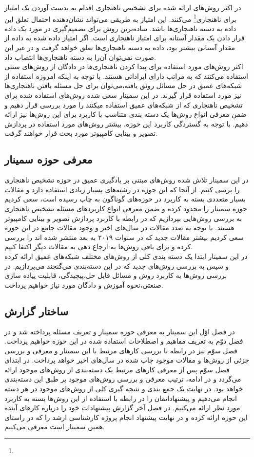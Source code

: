 \documentclass[12pt,a4paper]{article}
\theoremstyle{definition}
\theoremstyle{theorem}
\theoremstyle{definition}
\begin{document}
در اکثر روش‌های ارائه شده برای تشخیص ناهنجاری اقدام به بدست آوردن یک امتیاز برای ناهنجاری\footnote{} می‌کنند. این امتیاز به طریقی می‌تواند نشان‌‌دهنده احتمال تعلق این داده به دسته ناهنجاری‌ها باشد. ساده‌ترین روش برای تصمیم‌گیری در مورد یک داده قرار دادن یک مقدار آستانه برای امتیاز ناهنجاری است. اگر امتیاز داده شده به داده از مقدار آستانی بیشتر بود، داده به دسته ناهنجاری‌ها تعلق خواهد گرفت و در غیر این صورت نمی‌توان آن‌را به دسته ناهنجاری‌ها انتصاب داد.\\

اکثر روش‌های مورد استفاده برای پیدا کردن ناهنجاری‌ها در دادگان از روش‌های سنتی استفاده می‌کنند که به مراتب دارای ایراداتی هستند. با توجه به اینکه امروزه استفاده از شبکه‌های عمیق در حل مسائل رونق یافته،‌می‌توان برای حل مسئله یافتن ناهنجاری‌‌ها نیز مورد استفاده قرار گیرند. در این سمینار سعی شده روش‌های استفاده شده برای تشخیص ناهنجاری که از شبکه‌های عمیق استفاده میکنند را مورد بررسی قرار دهیم و ضمن معرفی انواع روش‌ها یک دسته بندی متناسب با کاربرد برای این روش‌ها نیز ارائه دهیم. با توجه به گستردگی کاربرد این حوزه، بیشتر روش‌های مورد استفاده در پردازش تصویر و بینایی کامپیوتر مورد بحث قرار خواهند گرفت.
	\subsection{معرفی حوزه سمینار}
در این سمینار تلاش شده روش‌های مبتنی بر یادگیری عمیق در حوزه تشخیص ناهنجاری را برسی کنیم. از آنجا که این حوزه در رشته‌های بسیار زیادی استفاده دارد و مقالات بسیار متعددی بسته به کاربرد در حوزه‌های گوناگون به چاپ رسیده است، سعی کردیم حوزه سمینار را محدود کرده و ضمن معرفی انواع کاربرد‌های مسئله تشخیص ناهنجاری به بررسی روش‌هایی بپردازیم که در رابطه با کاربرد پردازش تصویر و بینایی کامپیوتر هستند. با توجه به تعدد مقالات در سال‌های اخیر و وجود مقالات جامع در این حوزه سعی کردیم بیشتر مقالات جدید که در سنوات ۲۰۱۹ به بعد منتشر شده اند را بررسی کرده و برای باقی روش‌ها به ارجاع دهی به مقالات دیگر اکتفا کنیم.\\

در این سمینار ابتدا یک دسته بندی کلی از روش‌های مختلف شبکه‌های عمیق ارائه کرده و سپس به بررسی روش‌های جدید که در این دسته‌بندی می‌گنجند می‌پردازیم.
در بررسی روش‌ها به کاربرد روش و مسائل قابل حل،‌پیچیدگی، قابلیت پیاده سازی صنعتی،‌نحوه آموزش و دادگان مورد نیاز خواهیم پرداخت.
	\subsection{ساختار گزارش}
در فصل اوّل این سمینار به معرفی حوزه سمینار و تعریف مسئله پرداخته شد و در فصل دوّم به تعریف مفاهیم و اصطلاحات استفاده شده در این حوزه خواهیم پرداخت. فصل سوّم نیز در رابطه با بررسی کار‌های مرتبط با این سمینار و معرفی و بررسی جزئی از روش‌ها و مقالات موجود چاپ شده در سال‌های اخیر خواهد پرداخت. در ابتدای فصل سوّم پس از معرفی کار‌های مرتبط یک دسته‌بندی از روش‌های موجود ارائه می‌گردد و در ادامه، ترتیب معرفی و بررسی روش‌های موجود بر طبق این دسته‌بندی خواهد بود. در نهایت یک جمع بندی و نتیجه گیری کلی از روش‌های موجود در هر دسته انجام می‌دهیم و پیشنهاداتمان را در رابطه با استفاده از این روش‌ها بسته به کاربرد مورد نظر ارائه می‌کنیم. در فصل آخر گزارش پیشنهادات خود را درباره کار‌های آینده این حوزه ارائه کرده و در نهایت پیشنهاد انجام پروژه کارشناسی ارشد را که در راستای همین سمینار است معرفی می‌کنیم.
\end{document}
